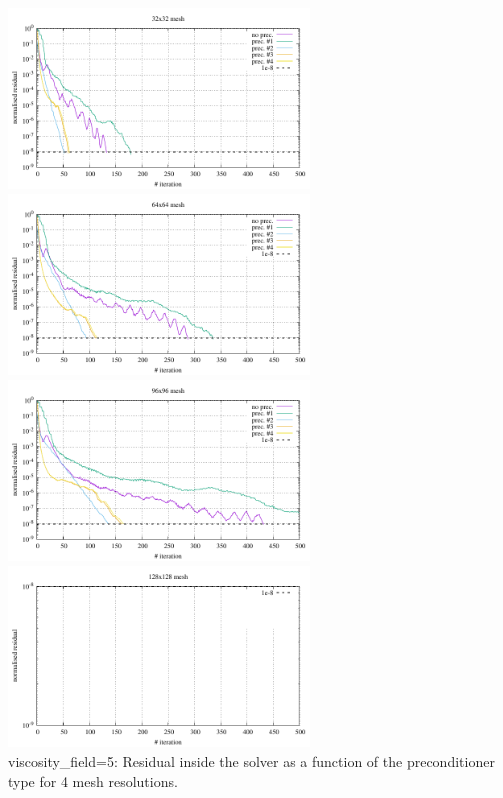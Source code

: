 \begin{center} 
\includegraphics[width=8cm]{python_codes/fieldstone_16/results/visc_field_5/residual_32x32.pdf}
\includegraphics[width=8cm]{python_codes/fieldstone_16/results/visc_field_5/residual_64x64.pdf}\\
\includegraphics[width=8cm]{python_codes/fieldstone_16/results/visc_field_5/residual_96x96.pdf}
\includegraphics[width=8cm]{python_codes/fieldstone_16/results/visc_field_5/residual_128x128.pdf}\\
{\captionfont viscosity\_field=5: Residual inside the solver as a function of the preconditioner type for
4 mesh resolutions.}
\end{center}

